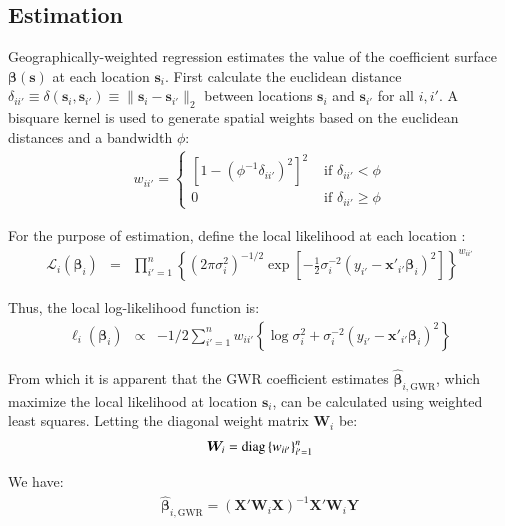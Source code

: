 \documentclass[authoryear, review, 11pt]{elsarticle}
\begin{document}
	\subsection{Estimation}		
	Geographically-weighted regression estimates the value of the coefficient surface $\bm{\beta}(\bm{s})$ at each location $\bm{s}_i$. First calculate the euclidean distance $\delta_{ii'} \equiv \delta\left(\bm{s}_i, \bm{s}_{i'}\right) \equiv \|\bm{s}_i  -\bm{s}_{i'}\|_2$ between locations $\bm{s}_i$ and $\bm{s}_{i'}$ for all $i, i'$. A bisquare kernel is used to generate spatial weights based on the euclidean distances and a bandwidth $\phi$:\\
	
	\begin{eqnarray}
		w_{ii'} = \begin{cases} \left[1-\left(\phi^{-1}\delta_{ii'}\right)^2\right]^2 &\mbox{ if } \delta_{ii'} < \phi \\ 0 &\mbox{ if } \delta_{ii'} \geq \phi \end{cases}
	\end{eqnarray}
	
	For the purpose of estimation, define the local likelihood at each location \citep{Fotheringham:2002}:
	\begin{eqnarray}
		\mathcal{L}_i \left(\bm{\beta}_i \right) &=& \prod_{i'=1}^n \left\{ \left(2 \pi \sigma^2_i  \right)^{-1/2}  \exp\left[-\frac{1}{2} \sigma^{-2}_i  \left(y_{i'} - \bm{x}'_{i'} \bm{\beta}_i \right)^2 \right] \right\} ^ {w_{ii'}}
	\end{eqnarray}
			
	Thus, the local log-likelihood function is:
	\begin{eqnarray}\label{eq:local-log-likelihood}
		\ell_i\left(\bm{\beta}_i\right) &\propto& -1/2 \sum_{i'=1}^n w_{ii'} \left\{ \log{\sigma^2_i}  + \sigma^{-2}_i  \left(y_{i'} - \bm{x}'_{i'} \bm{\beta}_i \right)^2 \right\}
	\end{eqnarray}
	
	From which it is apparent that the GWR coefficient estimates $\hat{\bm{\beta}}_{i,\text{GWR}}$, which maximize the local likelihood at location $\bm{s}_i$, can be calculated using weighted least squares. Letting the diagonal weight matrix $\bm{W}_i$ be:
	\begin{eqnarray}
		\bm{W}_i =  {\rm diag}\left\{w_{ii'}\right\}_{i' = 1}^n
	\end{eqnarray}
	
	We have:	
	\begin{eqnarray}
		\hat{\bm{\beta}}_{i, \text{GWR}} = \left( \bm{X}'\bm{W}_i\bm{X} \right)^{-1} \bm{X}'\bm{W}_i\bm{Y}
	\end{eqnarray}
	
\end{document}
